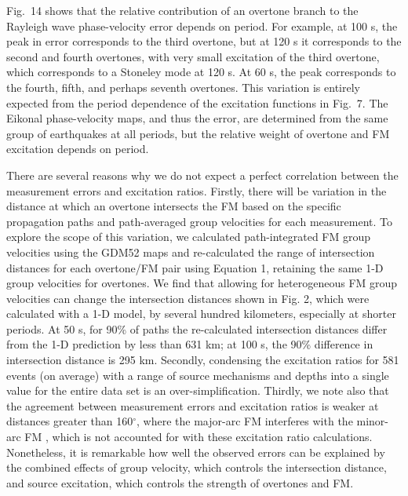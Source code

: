 \documentclass[extra,mreferee]{gji}
\begin{document}
Fig.\ 14 shows that the relative contribution of an overtone branch to the Rayleigh wave phase-velocity error depends on period. For example, at 100 s, the peak in error corresponds to the third overtone, but at 120 s it corresponds to the second and fourth overtones, with very small excitation of the third overtone, which corresponds to a Stoneley mode at 120 s. At 60 s, the peak corresponds to the fourth, fifth, and perhaps seventh overtones. This variation is entirely expected from the period dependence of the excitation functions in Fig.\ 7. The Eikonal phase-velocity maps, and thus the error, are determined from the same group of earthquakes at all periods, but the relative weight of overtone and FM excitation depends on period.

There are several reasons why we do not expect a perfect correlation between the measurement errors and excitation ratios. Firstly, there will be variation in the distance at which an overtone intersects the FM based on the specific propagation paths and path-averaged group velocities for each measurement. To explore the scope of this variation, we calculated path-integrated FM group velocities using the GDM52 maps \citep{ekstrom2011global} and re-calculated the range of intersection distances for each overtone/FM pair using Equation 1, retaining the same 1-D group velocities for overtones. We find that allowing for heterogeneous FM group velocities can change the intersection distances shown in Fig. 2, which were calculated with a 1-D model, by several hundred kilometers, especially at shorter periods. At 50 s, for 90\% of paths the re-calculated intersection distances differ from the 1-D prediction by less than 631 km; at 100 s, the 90\%  difference in intersection distance is 295 km. Secondly, condensing the excitation ratios for 581 events (on average) with a range of source mechanisms and depths into a single value for the entire data set is an over-simplification. Thirdly, we note also that the agreement between measurement errors and excitation ratios is weaker at distances greater than 160$^\circ$, where the major-arc FM interferes with the minor-arc FM \citep[e.g.][]{levshin2005minor}, which is not accounted for with these excitation ratio calculations. Nonetheless, it is remarkable how well the observed errors can be explained by the combined effects of group velocity, which controls the intersection distance, and source excitation, which controls the strength of overtones and FM. 
\end{document}
